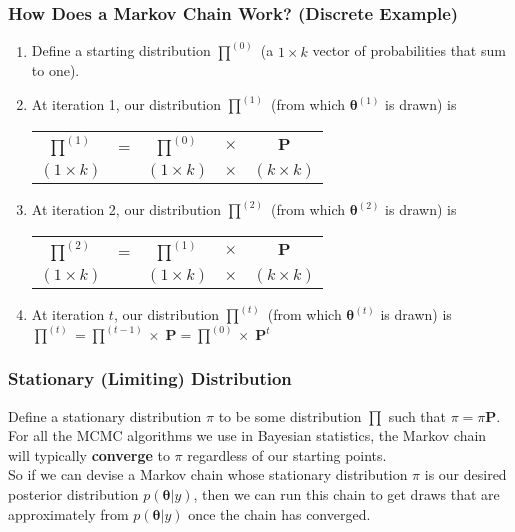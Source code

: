 \documentclass[handout]{beamer}
\begin{document}
\begin{frame}
\frametitle{How Does a Markov Chain Work? (Discrete Example)}
\pause
\begin{enumerate}
\item Define a starting distribution $\prod^{(0)}$ (a $1 \times k$
vector of probabilities that sum to one).
\pause
\medskip
\item At iteration 1, our distribution $\prod^{(1)}$ (from which $\bm{\theta}^{(1)}$ is drawn) is
\begin{center}
\begin{tabular}{ccccc}
$\prod^{(1)}$ & = & $\prod^{(0)}$ & $\times$ & $\bm{P}$\\
$(1 \times k)$ & & $(1 \times k)$ & $\times$ & $(k \times k)$
\end{tabular}
\end{center}
\pause
\medskip
\item At iteration 2, our distribution $\prod^{(2)}$ (from which $\bm{\theta}^{(2)}$ is drawn) is
\begin{center}
\begin{tabular}{ccccc}
$\prod^{(2)}$ & = & $\prod^{(1)}$ & $\times$ & $\bm{P}$\\
$(1 \times k)$ & & $(1 \times k)$ & $\times$ & $(k \times k)$
\end{tabular}
\end{center}
\medskip
\pause
\item At iteration $t$, our distribution $\prod^{(t)}$ (from which
$\bm{\theta}^{(t)}$ is drawn) is $\prod^{(t)}  = \prod^{(t-1)} \times
\; \bm{P} = \prod^{(0)}
\times \; \bm{P}^t$
\end{enumerate}
\end{frame}

\begin{frame}
\frametitle{Stationary (Limiting) Distribution}
\pause
Define a stationary distribution $\pi$ to be some distribution
$\prod$ such that $\pi = \pi \bm{P}$.  \\
\bigskip
\pause
For all the MCMC algorithms we use in Bayesian statistics, the Markov
chain will typically \textbf{converge} to $\pi$ regardless of our starting points.\\
\bigskip
\pause
So if we can devise a Markov chain whose stationary distribution $\pi$
is our desired posterior distribution $p(\bm{\theta} | y)$, then we
can run this chain to get draws that are approximately from
$p(\bm{\theta} | y)$ once the chain has converged.\\
\end{frame}
\end{document}
